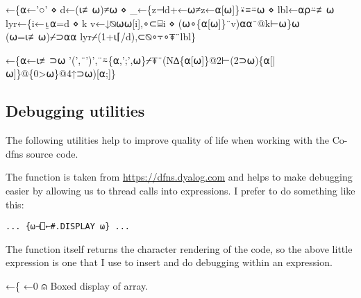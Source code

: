 \documentclass{article}%
\begin{document}
←\{⍺←'○' ⋄ d←(⍳≢⍵)≠⍵ ⋄ _←\{z⊣d+←⍵≠z←⍺[⍵]\}⍣≡⍨⍵ ⋄ lbl←⍺⍴⍨≢⍵
        lyr←\{i←⍸⍺=d ⋄ k v←↓⍉⍵⍵[i],∘⊂⌸i ⋄ (⍵∘\{⍺[⍵]\}¨v)⍺⍺¨@k⊢⍵\}⍵
        (⍵=⍳≢⍵)⌿⊃⍺⍺ lyr⌿(1+⍳⌈/d),⊂⍉∘⍪∘⍕¨lbl\}

←\{⍺←⍳≢⊃⍵
        '(',¨')',¨⍨\{⍺,';',⍵\}⌿⍕¨(N∆\{⍺[⍵]\}@2⊢(2⊃⍵)\{⍺[|⍵]\}@\{0>⍵\}@4↑⊃⍵)[⍺;]\}
\eatline
{}\nwendcode{}\nwdocspar
\subsection{Debugging utilities}

The following utilities help to improve quality of life when working
with the Co-dfns source code.

The {\Tt{}\nwendquote} function is taken from \url{https://dfns.dyalog.com}
and helps to make debugging easier by allowing us to thread
{\Tt{}\nwendquote} calls into expressions. I prefer to do something like
this:

\begin{verbatim}
... {⍵⊣⎕←#.DISPLAY ⍵} ...
\end{verbatim}

\noindent
The function itself returns the character rendering of the code,
so the above little expression is one that I use to insert and do
debugging within an expression.

\nwenddocs{}\endmoddef\nwstartdeflinemarkup\nwenddeflinemarkup
{}←\{ ←0                                                                                      ⍝ Boxed display of array.
\end{document}
